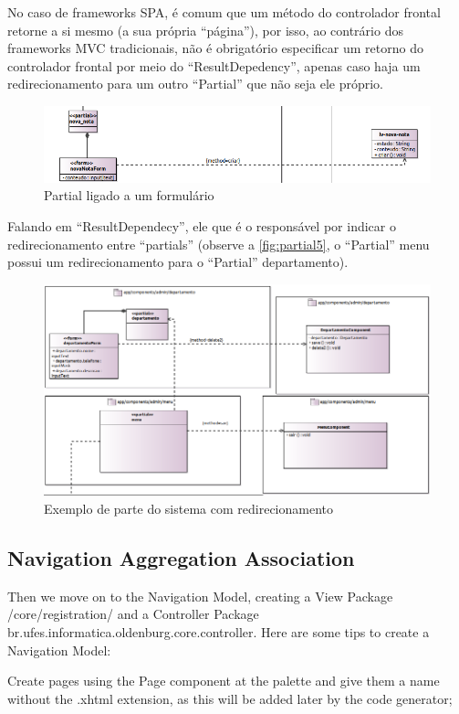 \documentclass[
article,			%
11pt,				%
oneside,			%
a4paper,			%
english,			%
brazil,				%
sumario=tradicional
]{abntex2}
\begin{document}
No caso de frameworks SPA, é comum que um método do controlador frontal retorne a si mesmo (a sua própria ``página''), por isso, ao contrário dos frameworks MVC tradicionais, não é obrigatório especificar um retorno do controlador frontal por meio do ``ResultDepedency'', apenas caso haja um redirecionamento para um outro ``Partial'' que não seja ele próprio.

\begin{figure}
	\centering
	\includegraphics[width=0.7\linewidth]{figuras/Partial2}
	\caption{Partial ligado a um formulário}
	\label{fig:partial2}
\end{figure}

Falando em ``ResultDependecy'', ele que é o responsável por indicar o redirecionamento entre ``partials'' (observe a \autoref{fig:partial5}, o ``Partial'' menu possui um redirecionamento para o ``Partial'' departamento).

\begin{figure}
	\centering
	\includegraphics[width=0.7\linewidth]{figuras/Partial5}
	\caption{Exemplo de parte do sistema com redirecionamento}
	\label{fig:partial5}
\end{figure}


\subsection{Navigation Aggregation Association}	

Then we move on to the Navigation Model, creating a View Package /core/registration/ and a Controller Package br.ufes.informatica.oldenburg.core.controller. Here are some tips to create a Navigation Model:

Create pages using the Page component at the palette and give them a name without the .xhtml extension, as this will be added later by the code generator;
\end{document}

